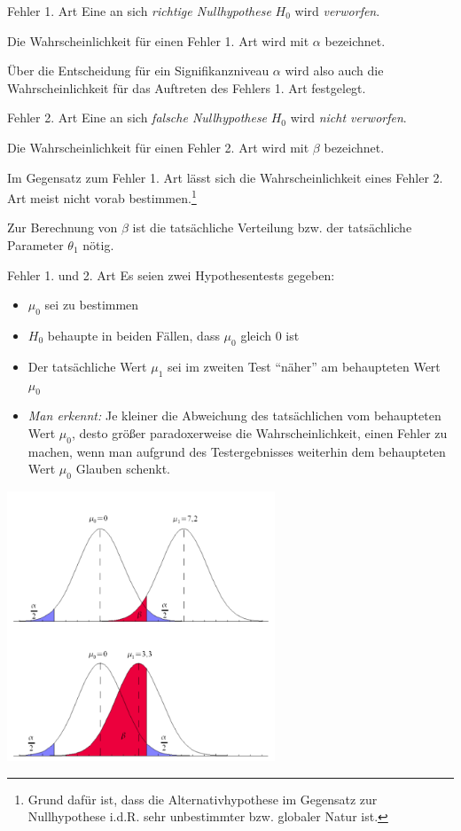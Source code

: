 \begin{defi}{Fehler 1. Art}
    Eine an sich \emph{richtige Nullhypothese} $H_0$ wird \emph{verworfen}.

    Die Wahrscheinlichkeit für einen Fehler 1. Art wird mit $\alpha$ bezeichnet.

    Über die Entscheidung für ein Signifikanzniveau $\alpha$ wird also auch die Wahrscheinlichkeit für das Auftreten des Fehlers 1. Art festgelegt.
\end{defi}

\begin{defi}{Fehler 2. Art}
    Eine an sich \emph{falsche Nullhypothese} $H_0$ wird \emph{nicht verworfen}.

    Die Wahrscheinlichkeit für einen Fehler 2. Art wird mit $\beta$ bezeichnet.

    Im Gegensatz zum Fehler 1. Art lässt sich die Wahrscheinlichkeit eines Fehler 2. Art meist nicht vorab bestimmen.\footnote{Grund dafür ist, dass die Alternativhypothese im Gegensatz zur Nullhypothese i.d.R. sehr unbestimmter bzw. globaler Natur ist.}

    Zur Berechnung von $\beta$ ist die tatsächliche Verteilung bzw. der tatsächliche Parameter $\theta_1$ nötig.
\end{defi}

\begin{example}{Fehler 1. und 2. Art}
    Es seien zwei Hypothesentests gegeben:
    \begin{itemize}
        \item $\mu_0$ sei zu bestimmen
        \item $H_0$ behaupte in beiden Fällen, dass $\mu_0$ gleich $0$ ist
        \item Der tatsächliche Wert $\mu_1$ sei im zweiten Test \enquote{näher} am behaupteten Wert $\mu_0$
        \item \emph{Man erkennt:} Je kleiner die Abweichung des tatsächlichen vom behaupteten Wert $\mu_0$, desto größer paradoxerweise die Wahrscheinlichkeit, einen Fehler zu machen, wenn man aufgrund des Testergebnisses weiterhin dem behaupteten Wert $\mu_0$ Glauben schenkt.
    \end{itemize}
    \begin{center}
        \includegraphics[width=0.6\textwidth]{includes/figures/example_fehler.png}
    \end{center}
\end{example}

